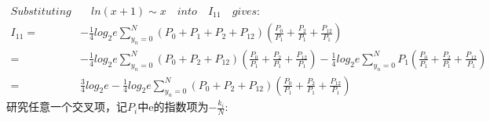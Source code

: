 \documentclass[12pt]{article}
\begin{document}
\begin{equation*}
    \begin{aligned}
       Substituting&\quad ln(x+1)\sim x\quad into\quad I_{11}\quad gives: \\
       I_{11}=& -\frac{1}{4}log_2e\sum_{y_n=0}^N(P_0+P_1+P_2+P_{12})\left(\frac{P_0}{P_1}+\frac{P_2}{P_1}+\frac{P_{12}}{P_1}\right)\\
       =&-\frac{1}{4}log_2e\sum_{y_n=0}^N(P_0+P_2+P_{12})\left(\frac{P_0}{P_1}+\frac{P_2}{P_1}+\frac{P_{12}}{P_1}\right)-\frac{1}{4}log_2e\sum_{y_n=0}^NP_1\left(\frac{P_0}{P_1}+\frac{P_2}{P_1}+\frac{P_{12}}{P_1}\right)\\
       =&\frac{3}{4}log_2e-\frac{1}{4}log_2e\sum_{y_n=0}^N(P_0+P_2+P_{12})\left(\frac{P_0}{P_1}+\frac{P_2}{P_1}+\frac{P_{12}}{P_1}\right)
    \end{aligned}
\end{equation*}
研究任意一个交叉项，记$P_i$中e的指数项为$-\frac{k_i}{N}$:
\end{document}

